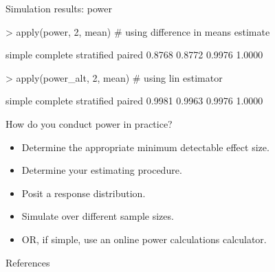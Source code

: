 \documentclass[xcolor={dvipsnames},handout]{beamer}
\begin{document}
\begin{frame}[fragile]{Simulation results: power}
\scriptsize
\begin{Schunk}
\begin{Sinput}
> apply(power, 2, mean) # using difference in means estimate
\end{Sinput}
\begin{Soutput}
    simple   complete stratified     paired
    0.8768     0.8772     0.9976     1.0000
\end{Soutput}
\begin{Sinput}
> apply(power_alt, 2, mean) # using lin estimator
\end{Sinput}
\begin{Soutput}
    simple   complete stratified     paired
    0.9981     0.9963     0.9976     1.0000
\end{Soutput}
\end{Schunk}

\end{frame}



\begin{frame}{How do you conduct power in practice?}

\begin{itemize}
\item Determine the appropriate minimum detectable effect size.
\item Determine your estimating procedure.
\item Posit a response distribution.
\item Simulate over different sample sizes.
\item OR, if simple, use an online power calculations calculator.
\end{itemize}

\end{frame}





\backupbegin

\begin{frame}[allowframebreaks]{References}
    
    
\end{frame}
\backupend
\end{document}

